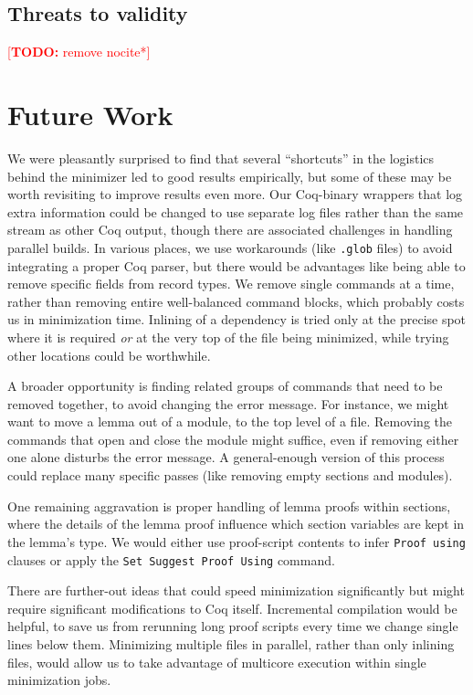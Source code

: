 \documentclass[a4paper,USenglish,cleveref,autoref,thm-restate]{lipics-v2021}
\makeatletter
\newcommand{\todo}[1]{%
\@latex@warning{TODO: \detokenize{#1} on page \thepage}%
\textcolor{red}{[\textbf{TODO:} #1]}}%
\makeatother
\begin{document}
\subsection{Threats to validity}



\nocite{*}%
\todo{remove nocite{*}}



\section{Future Work}\label{sec:future-work}

We were pleasantly surprised to find that several ``shortcuts'' in the logistics behind the minimizer led to good results empirically, but some of these may be worth revisiting to improve results even more.
Our Coq-binary wrappers that log extra information could be changed to use separate log files rather than the same stream as other Coq output, though there are associated challenges in handling parallel builds.
In various places, we use workarounds (like \texttt{.glob} files) to avoid integrating a proper Coq parser, but there would be advantages like being able to remove specific fields from record types.
We remove single commands at a time, rather than removing entire well-balanced command blocks, which probably costs us in minimization time.
Inlining of a dependency is tried only at the precise spot where it is required \emph{or} at the very top of the file being minimized, while trying other locations could be worthwhile.

A broader opportunity is finding related groups of commands that need to be removed together, to avoid changing the error message.
For instance, we might want to move a lemma out of a module, to the top level of a file.
Removing the commands that open and close the module might suffice, even if removing either one alone disturbs the error message.
A general-enough version of this process could replace many specific passes (like removing empty sections and modules).

One remaining aggravation is proper handling of lemma proofs within sections, where the details of the lemma proof influence which section variables are kept in the lemma's type.
We would either use proof-script contents to infer \verb|Proof using| clauses or apply the \verb|Set Suggest Proof Using| command.

There are further-out ideas that could speed minimization significantly but might require significant modifications to Coq itself.
Incremental compilation would be helpful, to save us from rerunning long proof scripts every time we change single lines below them.
Minimizing multiple files in parallel, rather than only inlining files, would allow us to take advantage of multicore execution within single minimization jobs.
\end{document}
